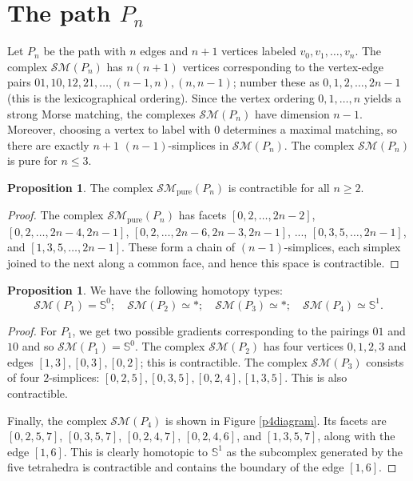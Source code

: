 \documentclass{amsart}
\theoremstyle{definition}
\newtheorem{proposition}[theorem]{Proposition}
\newcommand{\zs}{{\mathbb S}}
\newcommand{\sm}{{\mathcal{SM}}}
\newcommand{\smpure}{{\mathcal{SM}}_{\textrm{pure}}}
\begin{document}
\section{The path $P_n$}\label{sec:path}
Let $P_n$ be the path with $n$ edges and $n+1$ vertices labeled $v_0,v_1,\dots,v_n$. The complex $\sm(P_n)$ has $n(n+1)$ vertices corresponding to the vertex-edge pairs $01,10,12,21,\dots,(n-1,n),(n,n-1)$; number these as $0,1,2,\dots,2n-1$ (this is the lexicographical ordering). Since the vertex ordering $0,1,\dots,n$ yields a strong Morse matching, the complexes $\sm(P_n)$ have dimension $n-1$. Moreover, choosing a vertex to label with $0$ determines a maximal matching, so there are exactly $n+1$ $(n-1)$-simplices in $\sm(P_n)$. The complex $\sm(P_n)$ is pure for $n\le 3$. 

\begin{proposition}\label{prop:pnpure}
    The complex $\smpure(P_n)$ is contractible for all $n\ge 2$.
\end{proposition}

\begin{proof}
    The complex $\smpure(P_n)$ has facets $[0,2,\dots,2n-2]$, $[0,2,\dots,2n-4,2n-1]$, $[0,2,\dots,2n-6,2n-3,2n-1]$, ..., $[0,3,5,\dots,2n-1]$, and $[1,3,5,\dots,2n-1]$. These form a chain of $(n-1)$-simplices, each simplex joined to the next along a common face, and hence this space is contractible. 
\end{proof}

\begin{proposition}\label{shortpaths}
We have the following homotopy types:
$$\sm(P_1)= \zs^0;\quad \sm(P_2)\simeq\ast;\quad \sm(P_3)\simeq\ast;\quad \sm(P_4)\simeq \zs^1.$$
\end{proposition}

\begin{proof}
    For $P_1$, we get two possible gradients corresponding to the pairings $01$ and $10$ and so $\sm(P_1)=\zs^0$. The complex $\sm(P_2)$ has four vertices $0,1,2,3$ and edges $[1,3],[0,3],[0,2]$; this is contractible. The complex $\sm(P_3)$ consists of four $2$-simplices: $[0,2,5],[0,3,5],[0,2,4],[1,3,5]$. This is also contractible.

    Finally, the complex $\sm(P_4)$ is shown in Figure \ref{p4diagram}. Its facets are  $[0, 2, 5, 7]$, $[0, 3, 5, 7]$, $[0, 2, 4, 7]$, $[0, 2, 4, 6]$, and $[1, 3, 5, 7]$, along with the edge $[1,6]$. This is clearly homotopic to $\zs^1$ as the subcomplex generated by the five tetrahedra is contractible and contains the boundary of the edge $[1,6]$.
\end{proof}
\end{document}

